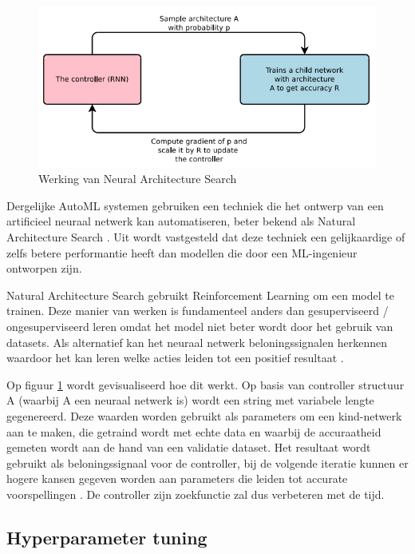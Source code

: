 \begin{figure}
    \includegraphics[width=\linewidth]{img/nas.png}
    \caption{Werking van Neural Architecture Search  \autocite{ZophL2016}}
    \label{fig:nas}
\end{figure}

Dergelijke AutoML systemen gebruiken een techniek die het ontwerp van een artificieel neuraal netwerk kan automatiseren, beter bekend als Natural Architecture Search \autocite{Elsken2019}. Uit \textcite{ZophL2016} wordt vastgesteld dat deze techniek een gelijkaardige of zelfs betere performantie heeft dan modellen die door een ML-ingenieur ontworpen zijn.

Natural Architecture Search gebruikt Reinforcement Learning om een model te trainen. Deze manier van werken is fundamenteel anders dan gesuperviseerd / ongesuperviseerd leren omdat het model niet beter wordt door het gebruik van datasets. Als alternatief kan het neuraal netwerk beloningssignalen herkennen waardoor het kan leren welke acties leiden tot een positief resultaat \autocite{Lievens2019}.

Op figuur \ref{fig:nas} wordt gevisualiseerd hoe dit werkt. Op basis van controller structuur A (waarbij A een neuraal netwerk is) wordt een string met variabele lengte gegenereerd. Deze waarden worden gebruikt als parameters om een kind-netwerk aan te maken, die getraind wordt met echte data en waarbij de accuraatheid gemeten wordt aan de hand van een validatie dataset. Het resultaat wordt gebruikt als beloningssignaal voor de controller, bij de volgende iteratie kunnen er hogere kansen gegeven worden aan parameters die leiden tot accurate voorspellingen \autocite{ZophL2016}. De controller zijn zoekfunctie zal dus verbeteren met de tijd.

\subsection{Hyperparameter tuning}

